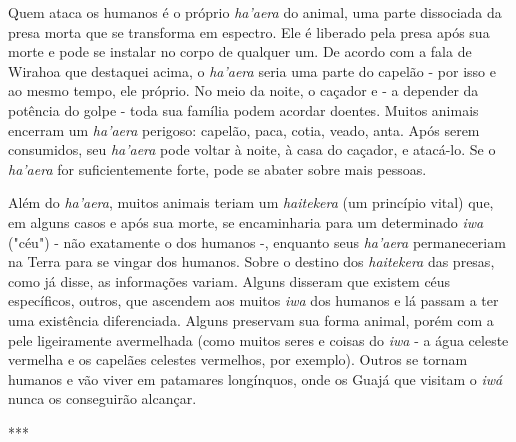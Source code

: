 Quem ataca os humanos é o próprio \emph{ha'aera} do animal, uma parte
dissociada da presa morta que se transforma em espectro. Ele é liberado
pela presa após sua morte e pode se instalar no corpo de qualquer um. De
acordo com a fala de Wirahoa que destaquei acima, o \emph{ha'aera} seria
uma parte do capelão - por isso e ao mesmo tempo, ele próprio. No meio
da noite, o caçador e - a depender da potência do golpe - toda sua
família podem acordar doentes. Muitos animais encerram um \emph{ha'aera}
perigoso: capelão, paca, cotia, veado, anta. Após serem consumidos, seu
\emph{ha'aera} pode voltar à noite, à casa do caçador, e atacá-lo. Se o
\emph{ha'aera} for suficientemente forte, pode se abater sobre mais
pessoas.

Além do \emph{ha'aera}, muitos animais teriam um \emph{haitekera} (um
princípio vital) que, em alguns casos e após sua morte, se encaminharia
para um determinado \emph{iwa} ("céu") - não exatamente o dos humanos -,
enquanto seus \emph{ha'aera} permaneceriam na Terra para se vingar dos
humanos. Sobre o destino dos \emph{haitekera} das presas, como já disse,
as informações variam. Alguns disseram que existem céus específicos,
outros, que ascendem aos muitos \emph{iwa} dos humanos e lá passam a ter
uma existência diferenciada. Alguns preservam sua forma animal, porém
com a pele ligeiramente avermelhada (como muitos seres e coisas do
\emph{iwa} - a água celeste vermelha e os capelães celestes vermelhos,
por exemplo). Outros se tornam humanos e vão viver em patamares
longínquos, onde os Guajá que visitam o \emph{iwá} nunca os conseguirão
alcançar.

***

